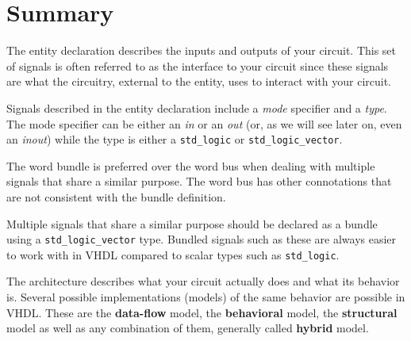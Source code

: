 \section{Summary}
\begin{my_list}
\item The entity declaration describes the inputs and outputs of your circuit. This set of signals is often referred to as the interface to your circuit since these signals are what the circuitry, external to the entity, uses to interact with your circuit.
\item Signals described in the entity declaration include a \textit{mode} specifier and a \textit{type}. The mode specifier can be either an \textit{in} or an \textit{out} (or, as we will see later on, even an \textit{inout}) while the type is either a \texttt{std\_logic} or \texttt{std\_logic\_vector}.
\item The word bundle is preferred over the word bus when dealing with multiple signals that share a similar purpose. The word bus has other connotations that are not consistent with the bundle definition.
\item Multiple signals that share a similar purpose should be declared as a bundle using a \texttt{std\_logic\_vector} type. Bundled signals such as these are always easier to work with in VHDL compared to scalar types such as \texttt{std\_logic}.
\item The architecture describes what your circuit actually does and what its behavior is. Several possible implementations (models) of the same behavior are possible in VHDL. These are the \textbf{data-flow} model, the \textbf{behavioral} model, the \textbf{structural} model as well as any combination of them, generally called \textbf{hybrid} model.
\end{my_list}

